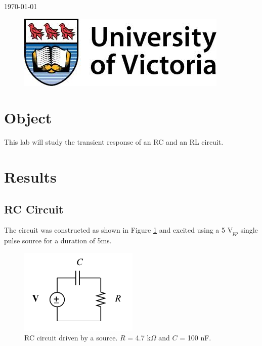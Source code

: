 \documentclass[12pt]{article}
\begin{document}
\begin{titlepage}
{\large \today}\\ %

\begin{figure}[b]	 %
	\centering
	\includegraphics[scale=0.3]{UVic_logo}
\end{figure}

\end{titlepage}





\section{Object}\label{sec:object}
This lab will study the transient response of an RC and an RL circuit.

\section{Results}\label{sec:results}
\subsection{RC Circuit}\label{sec:rc}
The circuit was constructed as shown in Figure \ref{fig:rc_circuit} and excited using a 5 V$_{pp}$ single pulse source for a duration of 5ms. 
\begin{figure}[h]
	\centering
	\includegraphics[scale = 0.75]{rc_circuit}
	\caption{RC circuit driven by a source. $R$ = 4.7 k$\Omega$ and $C$ = 100 nF. }
	\label{fig:rc_circuit}
\end{figure}
\end{document}

